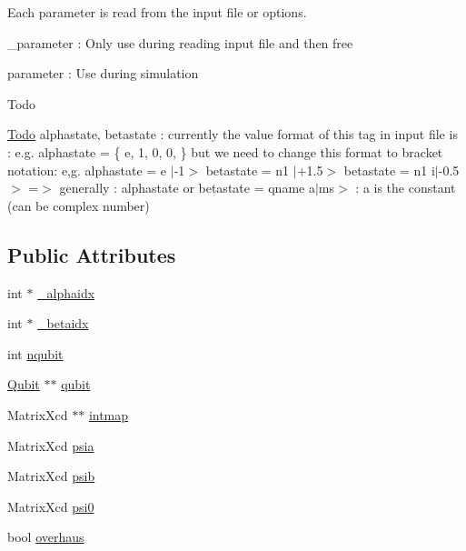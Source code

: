 Each parameter is read from the input file or options.
\begin{DoxyItemize}
\item \-\_\-parameter \-: Only use during reading input file and then free
\item parameter \-: Use during simulation \begin{DoxyRefDesc}{Todo}
\item[\hyperlink{todo__todo000016}{Todo}]alphastate, betastate \-: currently the value format of this tag in input file is \-: e.\-g. alphastate = \{ e, 1, 0, 0, \} but we need to change this format to bracket notation\-: e,g. alphastate = e $|$-\/1$>$ betastate = n1 $|$+1.5$>$ betastate = n1 i$|$-\/0.5$>$ =$>$ generally \-: alphastate or betastate = qname a$|$ms$>$ \-: a is the constant (can be complex number) \end{DoxyRefDesc}

\end{DoxyItemize}\subsection*{Public Attributes}
\begin{DoxyCompactItemize}
\item 
int $\ast$ \hyperlink{structQubitArray_a0a5c3875737d2a3bc14399109e89c82d}{\-\_\-alphaidx}
\item 
int $\ast$ \hyperlink{structQubitArray_a93fa20887ef373b3710d0734e9f1b7a4}{\-\_\-betaidx}
\item 
int \hyperlink{structQubitArray_ac87a8cdf149336447fe601f59c7ff371}{nqubit}
\item 
\hyperlink{structQubit}{Qubit} $\ast$$\ast$ \hyperlink{structQubitArray_ae87046f60e524d2aed1f6605c746d86e}{qubit}
\item 
Matrix\-Xcd $\ast$$\ast$ \hyperlink{structQubitArray_a1d74d3f22fe851f267c72b8cda416dd0}{intmap}
\item 
Matrix\-Xcd \hyperlink{structQubitArray_a168f33429921f2605e8c3ab850d3e6d9}{psia}
\item 
Matrix\-Xcd \hyperlink{structQubitArray_ad88cb397f3656eb7ac316e966d5e9172}{psib}
\item 
Matrix\-Xcd \hyperlink{structQubitArray_a17543dd30e2e5ef672ff5f751119beea}{psi0}
\item 
bool \hyperlink{structQubitArray_ab1cb38fcd5640338fad8c2abc868b53e}{overhaus}
\end{DoxyCompactItemize}


